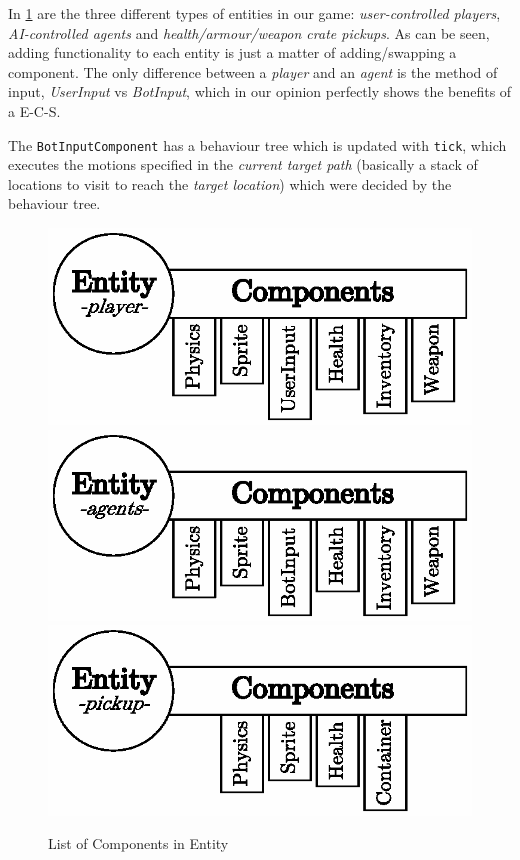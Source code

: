 \documentclass[a4paper, twocolumn]{article}
\begin{document}
        In \cref{fig:entity_component_system} are the three different types of entities in our game: \emph{user-controlled players}, \emph{AI-controlled agents} and \emph{health/armour/weapon crate pickups}. As can be seen, adding functionality to each entity is just a matter of adding/swapping a component. The only difference between a \emph{player} and an \emph{agent} is the method of input, \emph{UserInput} vs \emph{BotInput}, which in our opinion perfectly shows the benefits of a E-C-S.

        The \texttt{BotInputComponent} has a behaviour tree which is updated with \texttt{tick}, which executes the motions specified in the \emph{current target path} (basically a stack of locations to visit to reach the \emph{target location}) which were decided by the behaviour tree.
        
        \begin{figure}[H]
            \centering
            \includegraphics[width=0.8\linewidth]{share/player_entity.eps}
            \includegraphics[width=0.8\linewidth]{share/agent_entity.eps}
            \includegraphics[width=0.8\linewidth]{share/pickup_entity.eps}
            \caption{List of Components in Entity}
            \label{fig:entity_component_system}
        \end{figure}
\end{document}
